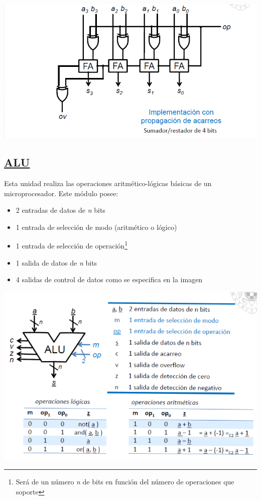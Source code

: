 \documentclass[a4paper,10pt]{book}
\begin{document}
\begin{center}
\includegraphics[scale=0.75]{sumador_restador_tripas}
\end{center}

\subsection*{\underline{ALU}}
Esta unidad realiza las operaciones aritmético-lógicas básicas de un microprocesador. Este módulo posee:
\begin{itemize}
\item 2 entradas de datos de \textit{n} bits
\item 1 entrada de selección de modo (aritmético o lógico)
\item 1 entrada de selección de operación\footnote{Será de un número \textit{n} de bits en función del número de operaciones que soporte}
\item 1 salida de datos de \textit{n} bits
\item 4 salidas de control de datos como se especifica en la imagen
\end{itemize}

\begin{center}
\includegraphics[scale=0.75]{ALU_diseño}
\end{center}
\end{document}
